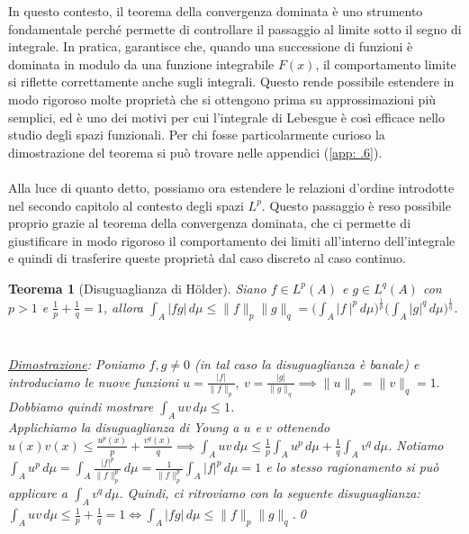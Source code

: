 \documentclass[a4paper,12pt]{report}
\newtheorem{teorema}{Teorema}[chapter]
\newcommand{\gt}{>}
\begin{document}
In questo contesto, il teorema della convergenza dominata è uno strumento fondamentale perché permette di controllare il passaggio al limite sotto il segno di integrale. In pratica, garantisce che, quando una successione di funzioni è dominata in modulo da una funzione integrabile $F(x)$, il comportamento limite si riflette correttamente anche sugli integrali. Questo rende possibile estendere in modo rigoroso molte proprietà che si ottengono prima su approssimazioni più semplici, ed è uno dei motivi per cui l'integrale di Lebesgue è così efficace nello studio degli spazi funzionali. Per chi fosse particolarmente curioso la dimostrazione del teorema si può trovare nelle appendici (\ref{app: .6}).
\\
\\ Alla luce di quanto detto, possiamo ora estendere le relazioni d’ordine introdotte nel secondo capitolo al contesto degli spazi $L^p$. Questo passaggio è reso possibile proprio grazie al teorema della convergenza dominata, che ci permette di giustificare in modo rigoroso il comportamento dei limiti all’interno dell’integrale e quindi di trasferire queste proprietà dal caso discreto al caso continuo.

\begin{teorema}[Disuguaglianza di  Hölder]
    Siano $f\in L^p(A)$ e $g\in L^q(A)$ con $p\gt 1$ e $\displaystyle\frac{1}{p}+\frac{1}{q}=1$, allora $\displaystyle\int_A|fg|\,d\mu\leq\|f\|_p\|g\|_q=\bigg(\int_A|f\  |^p\,d\mu\bigg)^\frac{1}{p}\bigg(\int_A|g|^q\,d\mu\bigg)^\frac{1}{q}$.
    \\
    \\
    \\ \underline{Dimostrazione}: Poniamo $f,g\neq 0$ (in tal caso la disuguaglianza è banale) e introduciamo le nuove funzioni $u=\displaystyle\frac{|f|}{\|f\|_p}, \ v=\frac{|g|}{\|g\|_q}\implies \|u\|_p=\|v\|_q=1.$ 
    \\Dobbiamo quindi mostrare $\displaystyle\int_Auv\,d\mu\leq 1$.
    \\Applichiamo la disuguaglianza di Young a $u$ e $v$ ottenendo $u(x)v(x)\leq\displaystyle\frac{u^p(x)}{p}+\frac{v^q(x)}{q}\implies \int_Auv\,d\mu\leq\frac{1}{p}\int_Au^p\,d\mu+\frac{1}{q}\int_Av^q\,d\mu$. \mbox{Notiamo $\displaystyle\int_Au^p\,d\mu=\int_A\frac{|f|^p}{\|f\|_p^p}\,d\mu=\frac{1}{\|f\|_p^p}\int_A|f|^p\,d\mu=1$} e lo stesso ragionamento si può applicare a $\displaystyle\int_Av^q\,d\mu$. Quindi, ci ritroviamo con la seguente disuguaglianza:
    $\displaystyle\int_Auv\,d\mu\leq\frac{1}{p}+\frac{1}{q}=1 \iff\int_A|fg|\,d\mu\leq\|f\|_p\|g\|_q$.\qed
\end{teorema}
\end{document}
